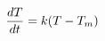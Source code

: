 \documentclass[preview]{standalone}
\begin{document}
\begin{align*}
\special{dvisvgm:raw <g id='unique000'>}\dfrac{dT}{dt} = k(T - T_m)\special{dvisvgm:raw </g>}
\end{align*}
\end{document}

